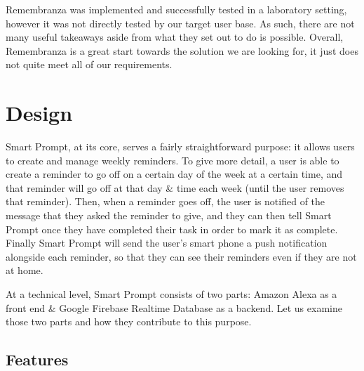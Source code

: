 \documentclass[11pt, oneside]{article}
\begin{document}
Remembranza was implemented and successfully tested in a laboratory setting, however it was not directly tested by our target user base. 
As such, there are not many useful takeaways aside from what they set out to do is possible. 
Overall, Remembranza is a great start towards the solution we are looking for, it just does not quite meet all of our requirements. 










\section{Design}

Smart Prompt, at its core, serves a fairly straightforward purpose: it allows users to create and manage weekly reminders. 
To give more detail, a user is able to create a reminder to go off on a certain day of the week at a certain time, and that reminder will go off at that day \& time each week (until the user removes that reminder). 
Then, when a reminder goes off, the user is notified of the message that they asked the reminder to give, and they can then tell Smart Prompt once they have completed their task in order to mark it as complete. 
Finally Smart Prompt will send the user's smart phone a push notification alongside each reminder, so that they can see their reminders even if they are not at home. 

At a technical level, Smart Prompt consists of two parts: Amazon Alexa as a front end \& Google Firebase Realtime Database as a backend. 
Let us examine those two parts and how they contribute to this purpose. 

\subsection{Features}
\end{document}
